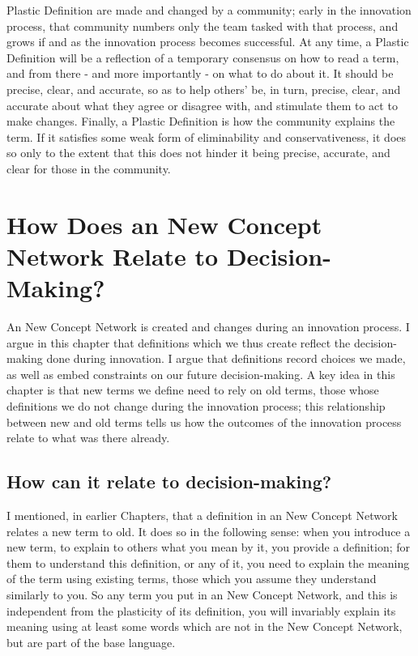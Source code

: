 \documentclass[graybox,envcountchap,sectrefs]{svmono}
\newcommand{\ncnf}{New Concept Network}
\newcommand{\newdef}[1]{Plastic Definition}
\begin{document}
\newdef s are made and changed by a community; early in the innovation process, that community numbers only the team tasked with that process, and grows if and as the innovation process becomes successful. At any time, a \newdef{} will be a reflection of a temporary consensus on how to read a term, and from there - and more importantly - on what to do about it. It should be precise, clear, and accurate, so as to help others' be, in turn, precise, clear, and accurate about what they agree or disagree with, and stimulate them to act to make changes. Finally, a \newdef{} is how the community explains the term. If it satisfies some weak form of eliminability and conservativeness, it does so only to the extent that this does not hinder it being precise, accurate, and clear for those in the community.


\printbibliography



\chapter{How Does an \ncnf{} Relate to Decision-Making?}
\label{c6}

An \ncnf{} is created and changes during an innovation process. I argue in this chapter that definitions which we thus create reflect the decision-making done during innovation. I argue that definitions record choices we made, as well as embed constraints on our future decision-making. A key idea in this chapter is that new terms we define need to rely on old terms, those whose definitions we do not change during the innovation process; this relationship between new and old terms tells us how the outcomes of the innovation process relate to what was there already.

\section{How can it relate to decision-making?}
\label{c6:s1}
I mentioned, in earlier Chapters, that a definition in an \ncnf{} relates a new term to old. It does so in the following sense: when you introduce a new term, to explain to others what you mean by it, you provide a definition; for them to understand this definition, or any of it, you need to explain the meaning of the term using existing terms, those which you assume they understand similarly to you. So any term you put in an \ncnf{}, and this is independent from the plasticity of its definition, you will invariably explain its meaning using at least some words which are not in the \ncnf{}, but are part of the base language.
\end{document}
